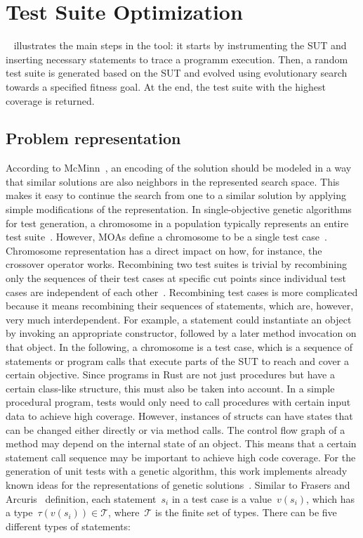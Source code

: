 \documentclass[paper=a4,%
  twoside,%
  BCOR4mm,%
  abstract=true,%
  toc=bibliography,%
  chapterprefix=true,%
  toc=bibliographynumbered,%
  open=right,%
  english,%
  pagesize=pdftex]{scrreprt}
\begin{document}
\section{Test Suite Optimization}
~ illustrates the main steps in the tool: it starts by instrumenting the \ac{SUT} and inserting necessary statements to trace a programm execution. Then, a random test suite is generated based on the \ac{SUT} and evolved using evolutionary search towards a specified fitness goal. At the end, the test suite with the highest coverage is returned.

\subsection{Problem representation}
\label{sec:problem-representation}
According to McMinn~\cite{McMinn_2004}, an encoding of the solution should be modeled in a way that similar solutions are also neighbors in the represented search space. This makes it easy to continue the search from one to a similar solution by applying simple modifications of the representation. In single-objective genetic algorithms for test generation, a chromosome in a population typically represents an entire test suite~\cite{Fraser_2011a, Campos2017}. However, \acp{MOA} define a chromosome to be a single test case~\cite{Panichella2018}. Chromosome representation has a direct impact on how, for instance, the crossover operator works. Recombining two test suites is trivial by recombining only the sequences of their test cases at specific cut points since individual test cases are independent of each other~\cite{Fraser_2013}. Recombining test cases is more complicated because it means recombining their sequences of statements, which are, however, very much interdependent. For example, a statement could instantiate an object by invoking an appropriate constructor, followed by a later method invocation on that object. In the following, a chromosome is a test case, which is a sequence of statements or program calls that execute parts of the \ac{SUT} to reach and cover a certain objective. Since programs in Rust are not just procedures but have a certain class-like structure, this must also be taken into account. In a simple procedural program, tests would only need to call procedures with certain input data to achieve high coverage. However, instances of structs can have states that can be changed either directly or via method calls. The control flow graph of a method may depend on the internal state of an object. This means that a certain statement call sequence may be important to achieve high code coverage. For the generation of unit tests with a genetic algorithm, this work implements already known ideas for the representations of genetic solutions~\cite{Fraser2012,Tonella2004,Arcuri2008}. Similar to Frasers and Arcuris~\cite{Fraser_2011a} definition, each statement~$s_i$ in a test case is a value~$v(s_i)$, which has a type~$\tau(v(s_i)) \in \mathcal{T}$, where~$\mathcal{T}$ is the finite set of types. There can be five different types of statements:
\end{document}
